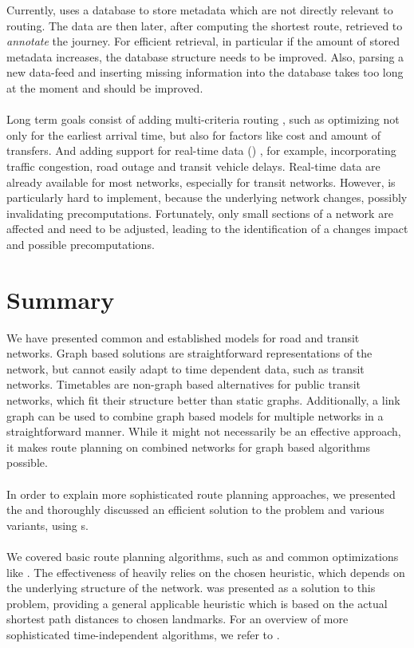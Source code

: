 	Currently, \cobweb uses a database to store metadata which are not directly relevant to routing. The data are then later, after computing
	the shortest route, retrieved to \textit{annotate} the journey. For efficient retrieval, in particular if the amount of stored metadata increases,
	the database structure needs to be improved. Also, parsing a new data-feed and inserting missing information into the database takes
	too long at the moment and should be improved.\\\\
	Long term goals consist of adding multi-criteria routing , such as optimizing not only for the earliest arrival time, but
	also for factors like cost and amount of transfers. And adding support for real-time data (\rtd) , for example, incorporating traffic
	congestion, road outage and transit vehicle delays.
	Real-time data are already available for most networks, especially for transit networks. However, \rtd is particularly hard to implement,
	because the underlying network changes, possibly invalidating precomputations. Fortunately, only small sections of a
	network are affected and need to be adjusted, leading to the identification of a changes impact and possible precomputations.

\section{Summary}
	We have presented common and established models for road and transit networks. Graph based solutions are straightforward representations of the network,
	but cannot easily adapt to time dependent data, such as transit networks. Timetables are non-graph based alternatives for public transit networks,
	which fit their structure better than static graphs. Additionally, a link graph can be used to combine graph based models for multiple networks in a
	straightforward manner. While it might not necessarily be an effective approach, it makes route planning on combined networks for graph based
	algorithms possible.\\\\
	In order to explain more sophisticated route planning approaches, we presented the \nearestNeighborProblem and thoroughly discussed an
	efficient solution to the problem and various variants, using {\coverTree}s.\\\\
	We covered basic route planning algorithms, such as \dijkstra and common optimizations like \astar. The effectiveness of \astar heavily relies on the chosen
	heuristic, which depends on the underlying structure of the network. \alt was presented as a solution to this problem, providing a general applicable heuristic
	which is based on the actual shortest path distances to chosen landmarks. For an overview of more sophisticated \uniModal time-independent
	algorithms, we refer to .
	
